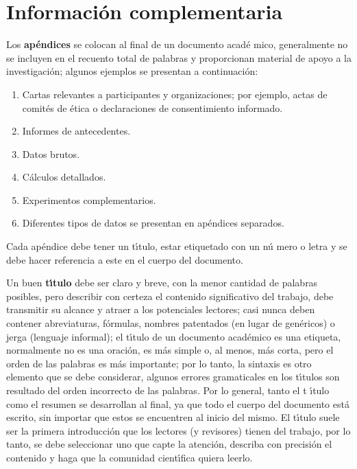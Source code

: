                       

 

\appendix{}

\chapter{Informaci\'{o}n complementaria}

Los \textbf{ap\'{e}ndices} se colocan al final de un documento acad\'{e}%
mico, generalmente no se incluyen en el recuento total de palabras y
proporcionan material de apoyo a la investigaci\'{o}n; algunos ejemplos se
presentan a continuaci\'{o}n:

\begin{enumerate}
\item Cartas relevantes a participantes y organizaciones; por ejemplo, actas
de comit\'{e}s de \'{e}tica o declaraciones de consentimiento informado.

\item Informes de antecedentes.

\item Datos brutos.

\item C\'{a}lculos detallados.

\item Experimentos complementarios.

\item Diferentes tipos de datos se presentan en ap\'{e}ndices separados.
\end{enumerate}

Cada ap\'{e}ndice debe tener un t\'{\i}tulo, estar etiquetado con un n\'{u}%
mero o letra y se debe hacer referencia a este en el cuerpo del documento.

\bigskip

Un buen \textbf{t\'{\i}tulo} debe ser claro y breve, con la menor cantidad
de palabras posibles, pero describir con certeza el contenido significativo
del trabajo, debe transmitir su alcance y atraer a los potenciales lectores;
casi nunca deben contener abreviaturas, f\'{o}rmulas, nombres patentados (en
lugar de gen\'{e}ricos) o jerga (lenguaje informal); el t\'{\i}tulo de un
documento acad\'{e}mico es una etiqueta, normalmente no es una oraci\'{o}n,
es m\'{a}s simple o, al menos, m\'{a}s corta, pero el orden de las palabras
es m\'{a}s importante; por lo tanto, la sintaxis es otro elemento que se
debe considerar, algunos errores gramaticales en los t\'{\i}tulos son
resultado del orden incorrecto de las palabras. Por lo general, tanto el t%
\'{\i}tulo como el resumen se desarrollan al final, ya que todo el cuerpo
del documento est\'{a} escrito, sin importar que estos se encuentren al
inicio del mismo. El t\'{\i}tulo suele ser la primera introducci\'{o}n que
los lectores (y revisores) tienen del trabajo, por lo tanto, se debe
seleccionar uno que capte la atenci\'{o}n, describa con precisi\'{o}n el
contenido y haga que la comunidad cient\'{\i}fica quiera leerlo.

